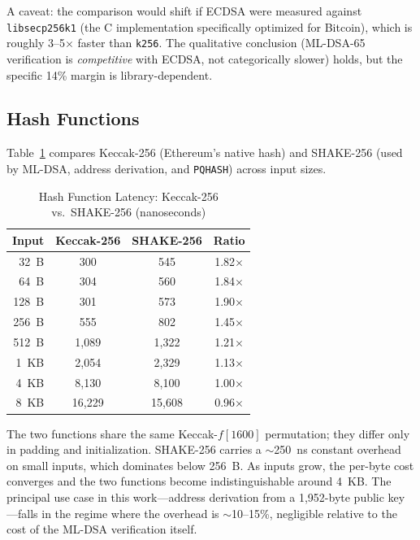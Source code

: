 \documentclass[journal,onecolumn,11pt]{IEEEtran}
\begin{document}
A caveat: the comparison would shift if ECDSA were measured against \texttt{libsecp256k1} (the C implementation specifically optimized for Bitcoin), which is roughly 3--5$\times$ faster than \texttt{k256}. The qualitative conclusion (ML-DSA-65 verification is \emph{competitive} with ECDSA, not categorically slower) holds, but the specific 14\% margin is library-dependent.

\subsection{Hash Functions}

Table~\ref{tab:hash_bench} compares Keccak-256 (Ethereum's native hash) and SHAKE-256 (used by ML-DSA, address derivation, and \texttt{PQHASH}) across input sizes.

\begin{table}[!t]
\caption{Hash Function Latency: Keccak-256 vs.\ SHAKE-256 (nanoseconds)}
\label{tab:hash_bench}
\centering
\begin{tabular}{@{}rccc@{}}
\toprule
\textbf{Input} & \textbf{Keccak-256} & \textbf{SHAKE-256} & \textbf{Ratio} \\
\midrule
32~B   & 300   & 545   & 1.82$\times$ \\
64~B   & 304   & 560   & 1.84$\times$ \\
128~B  & 301   & 573   & 1.90$\times$ \\
256~B  & 555   & 802   & 1.45$\times$ \\
512~B  & 1{,}089 & 1{,}322 & 1.21$\times$ \\
1~KB   & 2{,}054 & 2{,}329 & 1.13$\times$ \\
4~KB   & 8{,}130 & 8{,}100 & 1.00$\times$ \\
8~KB   & 16{,}229 & 15{,}608 & 0.96$\times$ \\
\bottomrule
\end{tabular}
\end{table}

The two functions share the same Keccak-$f[1600]$ permutation; they differ only in padding and initialization. SHAKE-256 carries a $\sim$250~ns constant overhead on small inputs, which dominates below 256~B. As inputs grow, the per-byte cost converges and the two functions become indistinguishable around 4~KB. The principal use case in this work---address derivation from a 1{,}952-byte public key---falls in the regime where the overhead is $\sim$10--15\%, negligible relative to the cost of the ML-DSA verification itself.
\end{document}
